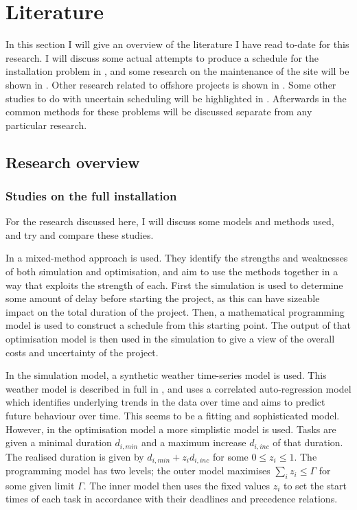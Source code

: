 \documentclass[a4paper,12pt]{article}
\begin{document}
\fi

\pagebreak

\section{Literature} \label{s:lit}
In this section I will give an overview of the literature I have read to-date for this research. I will discuss some actual attempts to produce a schedule for the installation problem in , and some research on the maintenance of the site will be shown in . Other research related to offshore projects is shown in . Some other studies to do with uncertain scheduling will be highlighted in .  Afterwards in  the common methods for these problems will be discussed separate from any particular research. 

\subsection{Research overview} \label{ss:rese}

\subsubsection{Studies on the full installation} \label{sss:sched}
For the research discussed here, I will discuss some models and methods used, and try and compare these studies. 

\bigskip

In \cite{barlow2018mixed} a mixed-method approach is used. They identify the strengths and weaknesses of both simulation and optimisation, and aim to use the methods together in a way that exploits the strength of each. First the simulation is used to determine some amount of delay before starting the project, as this can have sizeable impact on the total duration of the project. Then, a mathematical programming model is used to construct a schedule from this starting point. The output of that optimisation model is then used in the simulation to give a view of the overall costs and uncertainty of the project. 

In the simulation model, a synthetic weather time-series model is used. This weather model is described in full in \cite{dinwoodie2014operational} , and uses a correlated auto-regression model which identifies underlying trends in the data over time and aims to predict future behaviour over time. This seems to be a fitting and sophisticated model. However, in the optimisation model a more simplistic model is used. Tasks are given a minimal duration $d_{i, min}$ and a maximum increase $d_{i, inc}$ of that duration. The realised duration is given by $d_{i,  min} + z_i d_{i, inc}$ for some $0 \leq z_i \leq 1$. The programming model has two levels; the outer model maximises $\sum_i z_i \leq \Gamma$ for some given limit $\Gamma$. The inner model then uses the fixed values $z_i$ to set the start times of each task in accordance with their deadlines and precedence relations. 
\end{document}
